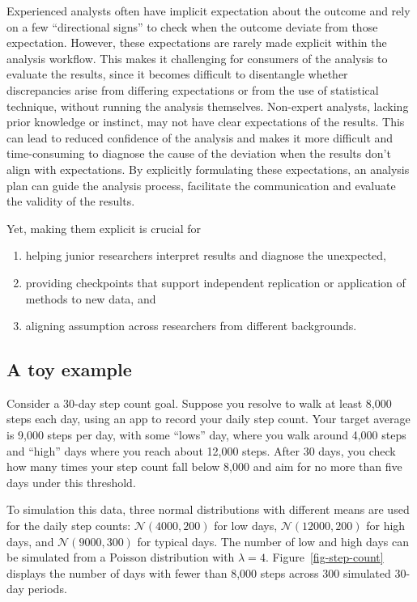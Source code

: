 \documentclass[
]{jds}
\providecommand{\tightlist}{%
  \setlength{\itemsep}{0pt}\setlength{\parskip}{0pt}}\usepackage{longtable,booktabs,array}
\begin{document}
Experienced analysts often have implicit expectation about the outcome
and rely on a few ``directional signs'' to check when the outcome
deviate from those expectation. However, these expectations are rarely
made explicit within the analysis workflow. This makes it challenging
for consumers of the analysis to evaluate the results, since it becomes
difficult to disentangle whether discrepancies arise from differing
expectations or from the use of statistical technique, without running
the analysis themselves. Non-expert analysts, lacking prior knowledge or
instinct, may not have clear expectations of the results. This can lead
to reduced confidence of the analysis and makes it more difficult and
time-consuming to diagnose the cause of the deviation when the results
don't align with expectations. By explicitly formulating these
expectations, an analysis plan can guide the analysis process,
facilitate the communication and evaluate the validity of the results.

Yet, making them explicit is crucial for

\begin{enumerate}
\def\labelenumi{\arabic{enumi})}
\tightlist
\item
  helping junior researchers interpret results and diagnose the
  unexpected,
\item
  providing checkpoints that support independent replication or
  application of methods to new data, and
\item
  aligning assumption across researchers from different backgrounds.
\end{enumerate}

\subsection{A toy example}\label{a-toy-example}

Consider a 30-day step count goal. Suppose you resolve to walk at least
8,000 steps each day, using an app to record your daily step count. Your
target average is 9,000 steps per day, with some ``lows'' day, where you
walk around 4,000 steps and ``high'' days where you reach about 12,000
steps. After 30 days, you check how many times your step count fall
below 8,000 and aim for no more than five days under this threshold.

To simulation this data, three normal distributions with different means
are used for the daily step counts: \(\mathcal{N}(4000, 200)\) for low
days, \(\mathcal{N}(12000, 200)\) for high days, and
\(\mathcal{N}(9000, 300)\) for typical days. The number of low and high
days can be simulated from a Poisson distribution with \(\lambda = 4\).
Figure~\ref{fig-step-count} displays the number of days with fewer than
8,000 steps across 300 simulated 30-day periods.
\end{document}
